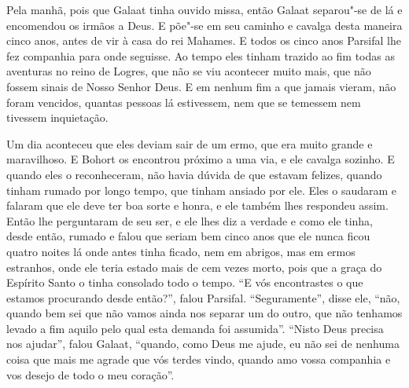 Pela manhã, pois que Galaat tinha ouvido missa, então Galaat separou"-se de lá e
encomendou os irmãos a Deus. E põe"-se em seu caminho e cavalga desta maneira
cinco anos, antes de vir à casa do rei Mahames. E todos os cinco anos Parsifal
lhe fez companhia para onde seguisse. Ao tempo eles tinham trazido ao fim todas
as aventuras no reino de Logres, que não se viu acontecer muito mais, que não
fossem sinais de Nosso Senhor Deus. E em nenhum fim a que jamais vieram, não
foram vencidos, quantas pessoas lá estivessem, nem que se temessem nem tivessem
inquietação. 

Um dia aconteceu que eles deviam sair de um ermo, que era muito grande e
maravilhoso. E Bohort os encontrou próximo a uma via, e ele cavalga sozinho. E
quando eles o reconheceram, não havia dúvida de que estavam felizes, quando
tinham rumado por longo tempo, que tinham ansiado por ele. Eles o saudaram e
falaram que ele deve ter boa sorte e honra, e ele também lhes respondeu assim.
Então lhe perguntaram de seu ser, e ele lhes diz a verdade e como ele tinha,
desde então, rumado e falou que seriam bem cinco anos que ele nunca ficou
quatro noites lá onde antes tinha ficado, nem em abrigos, mas em ermos
estranhos, onde ele teria estado mais de cem vezes morto, pois que a graça do
Espírito Santo o tinha consolado todo o tempo. “E vós encontrastes o que
estamos procurando desde então?”, falou Parsifal. “Seguramente”, disse ele,
“não, quando bem sei que não vamos ainda nos separar um do outro, que não
tenhamos levado a fim aquilo pelo qual esta demanda foi assumida”. “Nisto Deus
precisa nos ajudar”, falou Galaat, “quando, como Deus me ajude, eu não sei de
nenhuma coisa que mais me agrade que vós terdes vindo, quando amo vossa
companhia e vos desejo de todo o meu coração”. 

